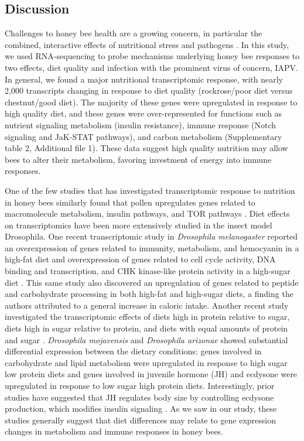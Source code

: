 \documentclass{bmcart}
\begin{document}
\begin{linenumbers}
\begin{doublespacing}
\section*{Discussion}

Challenges to honey bee health are a growing concern, in particular the combined, interactive effects of nutritional stress and pathogens \cite{AdamTothReview}. In this study, we used RNA-sequencing to probe mechanisms underlying honey bee responses to two effects, diet quality and infection with the prominent virus of concern, IAPV. In general, we found a major nutritional transcriptomic response, with nearly 2,000 transcripts changing in response to diet quality (rockrose/poor diet versus chestnut/good diet). The majority of these genes were upregulated in response to high quality diet, and these genes were over-represented for functions such as nutrient signaling metabolism (insulin resistance), immune response (Notch signaling and JaK-STAT pathways), and carbon metabolism (Supplementary table 2, Additional file 1). These data suggest high quality nutrition may allow bees to alter their metabolism, favoring investment of energy into immune responses.

One of the few studies that has investigated transcriptomic response to nutrition in honey bees similarly found that pollen upregulates genes related to macromolecule metabolism, insulin pathways, and TOR pathways \cite{alaux2}. Diet effects on transcriptomics have been more extensively studied in the insect model Drosophila. One recent transcriptomic study in \textit{Drosophila melanogaster} reported an overexpression of genes related to immunity, metabolism, and hemocyanin in a high-fat diet and overexpression of genes related to cell cycle activity, DNA binding and transcription, and CHK kinase-like protein activity in a high-sugar diet \cite{sugarFat}. This same study also discovered an upregulation of genes related to peptide and carbohydrate processing in both high-fat and high-sugar diets, a finding the authors attributed to a general increase in caloric intake. Another recent study investigated the transcriptomic effects of diets high in protein relative to sugar, diets high in sugar relative to protein, and diets with equal amounts of protein and sugar \cite{sugarProtein}. \textit{Drosophila mojavensis} and \textit{Drosophila arizonae} showed substantial differential expression between the dietary conditions: genes involved in carbohydrate and lipid metabolism were upregulated in response to high sugar low protein diets and genes involved in juvenile hormone (JH) and ecdysone were upregulated in response to low sugar high protein diets. Interestingly, prior studies have suggested that JH regulates body size by controlling ecdysone production, which modifies insulin signaling \cite{jHormone}. As we saw in our study, these studies generally suggest that diet differences may relate to gene expression changes in metabolism and immune responses in honey bees.


\end{doublespacing}
\end{linenumbers}
\end{document}
